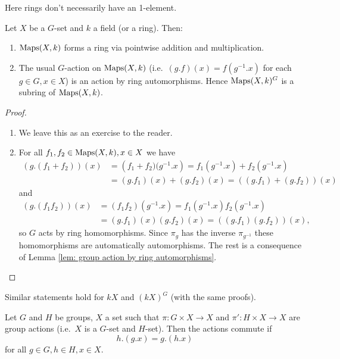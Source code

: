 \begin{rem}
 Here rings don't necessarily have an 1-element.
\end{rem}


\begin{expl}
 Let $X$ be a $G$-set and $k$ a field (or a ring). Then:
 \begin{enumerate}[label=\emph{\alph*})]
  \item
   $\operatorname{Maps}(X,k)$ forms a ring via pointwise addition and multiplication.
  \item
   The usual $G$-action on $\operatorname{Maps}(X,k)$ (i.e.\ $(g.f)(x) = f(g^{-1}.x)$ for each $g \in G, x \in X$) is an action by ring automorphisms. Hence $\operatorname{Maps}(X,k)^G$ is a subring of $\operatorname{Maps}(X,k)$.
 \end{enumerate}
 \begin{proof}
  \begin{enumerate}[label=\emph{\alph*})]
   \item
    We leave this as an exercise to the reader.
   \item
    For all $f_1, f_2 \in \operatorname{Maps}(X,k), x \in X$ we have
    \begin{align*}
     (g.(f_1+f_2))(x) &= \left(f_1+f_2)(g^{-1}.x\right) = f_1\left(g^{-1}.x\right) + f_2\left(g^{-1}.x\right) \\
     &= (g.f_1)(x) + (g.f_2)(x) = ((g.f_1)+(g.f_2))(x)
    \end{align*}
    and
    \begin{align*}
     (g.(f_1 f_2))(x) &= (f_1 f_2)\left(g^{-1}.x\right) = f_1\left(g^{-1}.x\right) f_2\left(g^{-1}.x\right) \\
     &= (g.f_1)(x) (g.f_2)(x) = ((g.f_1)(g.f_2))(x),
    \end{align*}
    so $G$ acts by ring homomorphisms. Since $\pi_g$ has the inverse $\pi_{g^{-1}}$ these homomorphisms are automatically automorphisms. The rest is a consequence of Lemma \ref{lem: group action by ring automorphisms}.
  \end{enumerate}
 \end{proof}
\end{expl}


\begin{rem}
 Similar statements hold for $kX$ and $(kX)^G$ (with the same proofs).
\end{rem}


\begin{defi}
 Let $G$ and $H$ be groups, $X$ a set such that $\pi \colon G \times X \to X$ and $\pi' \colon H \times X \to X$ are group actions (i.e.\ $X$ is a $G$-set and $H$-set). Then the actions commute if
 \[
  h.(g.x) = g.(h.x)
 \]
 for all $g \in G, h \in H, x \in X$.
\end{defi}


